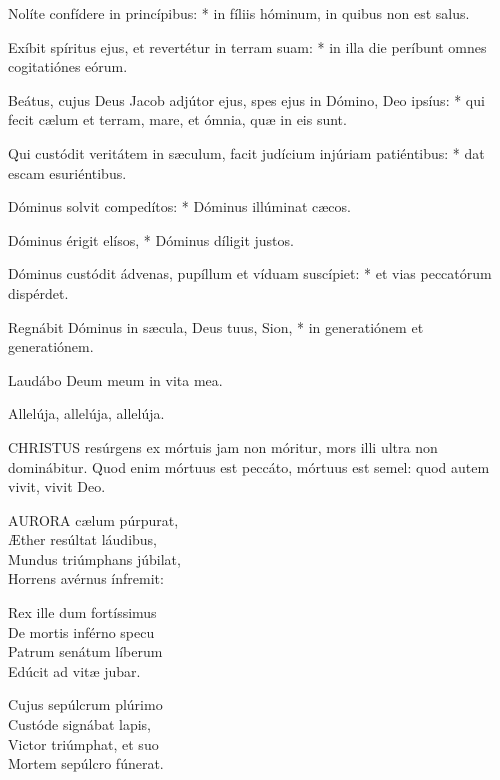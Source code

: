 Nolíte confídere in princípibus: * in fíliis hóminum, in quibus non est salus.

Exíbit spíritus ejus, et revertétur in terram suam: * in illa die períbunt omnes cogitatiónes eórum.

Beátus, cujus Deus Jacob adjútor ejus, spes ejus in Dómino, Deo ipsíus: * qui fecit cælum et terram, mare, et ómnia, quæ in eis sunt.

Qui custódit veritátem in sæculum, facit judícium injúriam patiéntibus: * dat escam esuriéntibus.

Dóminus solvit compedítos: * Dóminus illúminat cæcos.

Dóminus érigit elísos, * Dóminus díligit justos.

Dóminus custódit ádvenas, pupíllum et víduam suscípiet: * et vias peccatórum dispérdet.

Regnábit Dóminus in sæcula, Deus tuus, Sion, * in generatiónem et generatiónem.


 Laudábo Deum meum in vita mea.


 Allelúja, allelúja, allelúja.



\lettrine[lines=2]{C}{HRISTUS} resúrgens ex mórtuis jam non móritur, mors illi ultra non dominábitur. Quod enim mórtuus est peccáto, mórtuus est semel: quod autem vivit, vivit Deo.


\lettrine[lines=2]{A}{URORA} cælum púrpurat,\\
Æther resúltat láudibus,\\
Mundus triúmphans júbilat,\\
Horrens avérnus ínfremit:

Rex ille dum fortíssimus\\
De mortis inférno specu\\
Patrum senátum líberum\\
Edúcit ad vitæ jubar.

Cujus sepúlcrum plúrimo\\
Custóde signábat lapis,\\
Victor triúmphat, et suo\\
Mortem sepúlcro fúnerat.

